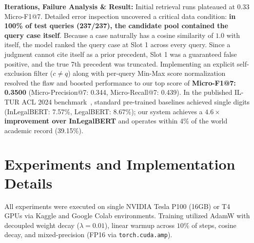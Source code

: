 \documentclass[11pt, oneside]{article}
\begin{document}
\medskip
\noindent
\textbf{Iterations, Failure Analysis \& Result:} Initial retrieval runs plateaued at 0.33 Micro-F1@7. Detailed error inspection uncovered a critical data condition: \textbf{in 100\% of test queries (237/237), the candidate pool contained the query case itself}. Because a case naturally has a cosine similarity of $1.0$ with itself, the model ranked the query case at Slot 1 across every query. Since a judgment cannot cite itself as a prior precedent, Slot 1 was a guaranteed false positive, and the true 7th precedent was truncated. Implementing an explicit self-exclusion filter ($c \neq q$) along with per-query Min-Max score normalization resolved the flaw and boosted performance to our top score of \textbf{Micro-F1@7: 0.3500} (Micro-Precision@7: 0.344, Micro-Recall@7: 0.439). In the published IL-TUR ACL 2024 benchmark~\cite{joshi2024iltur}, standard pre-trained baselines achieved single digits (InLegalBERT: 7.57\%, LegalBERT: 8.67\%); our system achieves a \textbf{$4.6\times$ improvement over InLegalBERT} and operates within 4\% of the world academic record (39.15\%).

\section{Experiments and Implementation Details}
\noindent
All experiments were executed on single NVIDIA Tesla P100 (16GB) or T4 GPUs via Kaggle and Google Colab environments. Training utilized AdamW with decoupled weight decay ($\lambda=0.01$), linear warmup across $10\%$ of steps, cosine decay, and mixed-precision (FP16 via \texttt{torch.cuda.amp}).
\end{document}
